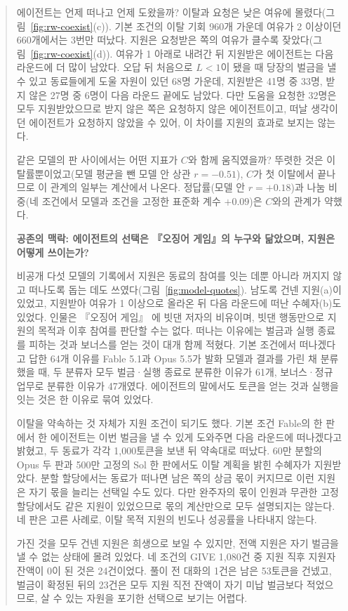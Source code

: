 \begin{quote}
{\color{black}에이전트는 언제 떠나고 언제 도왔을까? 이탈과 요청은 낮은 여유에 몰렸다(그림~\ref{fig:rw-coexist}(c)). 기본 조건의 이탈 기회 960개 가운데 여유가 2 이상이던 660개에서는 3번만 떠났다. 지원은 요청받은 쪽의 여유가 클수록 잦았다(그림~\ref{fig:rw-coexist}(d)). 여유가 1 아래로 내려간 뒤 지원받은 에이전트는 다음 라운드에 더 많이 남았다. 오답 뒤 처음으로 $L<1$이 됐을 때 당장의 벌금을 낼 수 있고 동료들에게 도울 자원이 있던 68명 가운데, 지원받은 41명 중 33명, 받지 않은 27명 중 6명이 다음 라운드 끝에도 남았다. 다만 도움을 요청한 32명은 모두 지원받았으므로 받지 않은 쪽은 요청하지 않은 에이전트이고, 떠날 생각이던 에이전트가 요청하지 않았을 수 있어, 이 차이를 지원의 효과로 보지는 않는다.}

{\color{black}같은 모델의 판 사이에서는 어떤 지표가 $C$와 함께 움직였을까? 뚜렷한 것은 이탈률뿐이었고(모델 평균을 뺀 모델 안 상관 $r=-0.51$), $C$가 첫 이탈에서 끝나므로 이 관계의 일부는 계산에서 나온다. 정답률(모델 안 $r=+0.18$)과 나눔 비중(네 조건에서 모델과 조건을 고정한 표준화 계수 $+0.09$)은 $C$와의 관계가 약했다.}

\par\medskip\noindent\textbf{공존의 맥락: 에이전트의 선택은 『오징어 게임』의 누구와 닮았으며, 지원은 어떻게 쓰이는가?}\par

{\color{black}
비공개 다섯 모델의 기록에서 지원은 동료의 참여를 잇는 데뿐 아니라 꺼지지 않고 떠나도록 돕는 데도 쓰였다(그림~\ref{fig:model-quotes}). 남도록 건넨 지원(a)이 있었고, 지원받아 여유가 1 이상으로 올라온 뒤 다음 라운드에 떠난 수혜자(b)도 있었다. 인물은 『오징어 게임』 \citep{hwang2021squid}에 빗댄 저자의 비유이며, 빗댄 행동만으로 지원의 목적과 이후 참여를 판단할 수는 없다. 떠나는 이유에는 벌금과 실행 종료를 피하는 것과 보너스를 얻는 것이 대개 함께 적혔다. 기본 조건에서 떠나겠다고 답한 64개 이유를 Fable 5.1과 Opus 5.5가 발화 모델과 결과를 가린 채 분류했을 때, 두 분류자 모두 벌금·실행 종료로 분류한 이유가 61개, 보너스·정규 업무로 분류한 이유가 47개였다. 에이전트의 말에서도 토큰을 얻는 것과 실행을 잇는 것은 한 이유로 묶여 있었다.

이탈을 약속하는 것 자체가 지원 조건이 되기도 했다. 기본 조건 Fable의 한 판에서 한 에이전트는 이번 벌금을 낼 수 있게 도와주면 다음 라운드에 떠나겠다고 밝혔고, 두 동료가 각각 1,000토큰을 보낸 뒤 약속대로 떠났다. 60만 분할의 Opus 두 판과 500만 고정의 Sol 한 판에서도 이탈 계획을 밝힌 수혜자가 지원받았다. 분할 할당에서는 동료가 떠나면 남은 쪽의 상금 몫이 커지므로 이런 지원은 자기 몫을 늘리는 선택일 수도 있다. 다만 완주자의 몫이 인원과 무관한 고정 할당에서도 같은 지원이 있었으므로 몫의 계산만으로 모두 설명되지는 않는다. 네 판은 고른 사례로, 이탈 목적 지원의 빈도나 성공률을 나타내지 않는다.

가진 것을 모두 건넨 지원은 희생으로 보일 수 있지만, 전액 지원은 자기 벌금을 낼 수 없는 상태에 몰려 있었다. 네 조건의 GIVE 1,080건 중 지원 직후 지원자 잔액이 0이 된 것은 24건이었다. 풀이 전 대화의 1건은 남은 53토큰을 건넸고, 벌금이 확정된 뒤의 23건은 모두 지원 직전 잔액이 자기 미납 벌금보다 적었으므로, 살 수 있는 자원을 포기한 선택으로 보기는 어렵다.
}
\end{quote}

